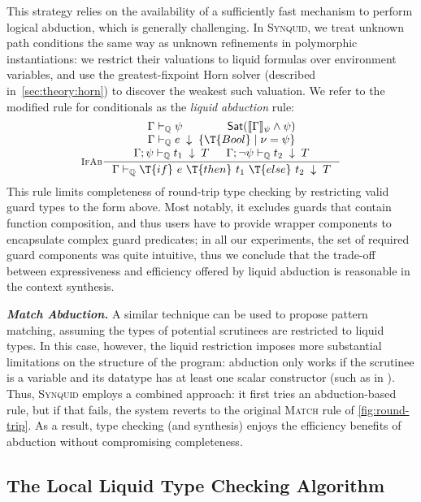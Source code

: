 \documentclass[10pt,preprint]{sigplanconf-pldi16}
\theoremstyle{definition}
\newcommand{\custompar}[1]{\parskip 0pt \textbf{\textit{#1}}}
\renewcommand{\And}{\wedge}
\newcommand{\env}{\Gamma}
\newcommand{\consume}{\;\downarrow\;}
\newcommand{\quals}{\mathbb{Q}}
\newcommand{\entailsQ}{\vdash_{\quals}}
\newcommand{\lang}{\textsc{Synquid}\xspace}
\begin{document}
This strategy relies on the availability of a sufficiently fast mechanism to perform logical abduction, which is generally challenging.
In \lang, we treat unknown path conditions the same way as unknown refinements in polymorphic instantiations:
we restrict their valuations to liquid formulas over environment variables,
and use the greatest-fixpoint Horn solver (described in~\autoref{sec:theory:horn}) to discover the weakest such valuation.
We refer to the modified rule for conditionals as the \emph{liquid abduction} rule:
$$
\inference[\textsc{IfAb}]
{\env \entailsQ \psi & \mathsf{Sat}(\llbracket\Gamma\rrbracket_{\psi}\And\psi) \\ 
\env \entailsQ e \consume \{\T{Bool}\mid \nu = \psi\} \\
\env;\psi \entailsQ t_1 \consume T  &  \env;\neg\psi \entailsQ t_2 \consume T}
{\env \entailsQ\T{if}\ e\ \T{then}\ t_1\ \T{else}\ t_2 \consume T}
$$
This rule limits completeness of round-trip type checking by restricting valid guard types to the form above.
Most notably, it excludes guards that contain function composition,
and thus users have to provide wrapper components to encapsulate complex guard predicates;
in all our experiments, the set of required guard components was quite intuitive,
thus we conclude that the trade-off between expressiveness and efficiency offered by liquid abduction is reasonable in the context synthesis.

\custompar{Match Abduction.}
A similar technique can be used to propose pattern matching,
assuming the types of potential scrutinees are restricted to liquid types.
In this case, however, the liquid restriction imposes more substantial limitations on the structure of the program:
abduction only works if the scrutinee is a variable
and its datatype has at least one scalar constructor (such as  in ).
Thus, \lang employs a combined approach:
it first tries an abduction-based rule, but if that fails, the system reverts to the original \textsc{Match} rule of \autoref{fig:round-trip}.
As a result, type checking (and synthesis) enjoys the efficiency benefits of abduction without compromising completeness.



\subsection{The Local Liquid Type Checking Algorithm}\label{sec:theory:subtyping}
\end{document}
